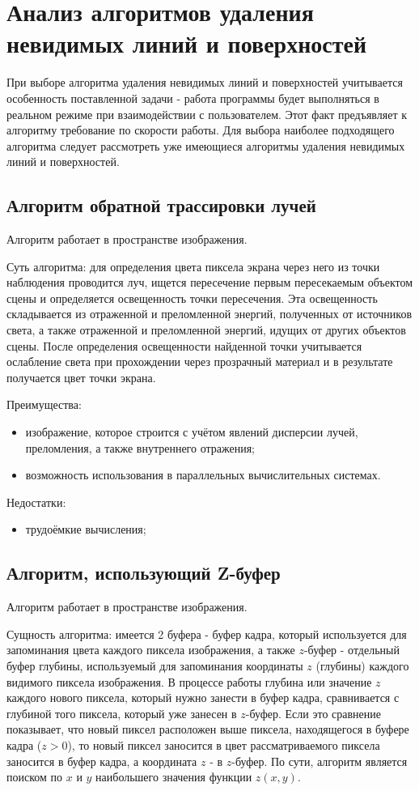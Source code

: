 \section{Анализ алгоритмов удаления невидимых линий и поверхностей}

При выборе алгоритма удаления невидимых линий и поверхностей учитывается особенность поставленной
задачи - работа программы будет выполняться в реальном режиме при взаимодействии с пользователем.
Этот факт предъявляет к алгоритму требование по скорости работы.
Для выбора наиболее подходящего алгоритма следует рассмотреть уже имеющиеся алгоритмы удаления невидимых линий и поверхностей.

\subsection{Алгоритм обратной трассировки лучей}
Алгоритм работает в пространстве изображения\cite{raytr}.

Суть алгоритма: для определения цвета пиксела экрана через него из точки наблюдения проводится луч,
ищется пересечение первым пересекаемым объектом сцены и определяется освещенность точки пересечения.
Эта освещенность складывается из отраженной и преломленной энергий, полученных от источников света,
а также отраженной и преломленной энергий, идущих от других объектов сцены.
После определения освещенности найденной точки учитывается ослабление света при прохождении через прозрачный материал
и в результате получается цвет точки экрана.

Преимущества:
\begin{itemize}
    \item изображение, которое строится с учётом явлений дисперсии лучей, преломления, а также внутреннего отражения;
    \item возможность использования в параллельных вычислительных системах.
\end{itemize}

Недостатки:
\begin{itemize}
    \item трудоёмкие вычисления\cite{tracer_proof};
\end{itemize}

\subsection{Алгоритм, использующий Z-буфер}
Алгоритм работает в пространстве изображения\cite{zbuf}.

Сущность алгоритма: имеется 2 буфера - буфер кадра, который используется для запоминания цвета каждого
пиксела изображения, а также $z$-буфер - отдельный буфер глубины,
используемый для запоминания координаты $z$ (глубины)
каждого видимого пиксела изображения.
В процессе работы глубина или значение $z$ каждого нового пиксела,
который нужно занести в буфер кадра, сравнивается с глубиной того пиксела,
который уже занесен в $z$-буфер.
Если это сравнение показывает, что новый пиксел расположен выше пиксела,
находящегося в буфере кадра ($z > 0$),
то новый пиксел заносится в цвет рассматриваемого пиксела заносится в буфер кадра, а координата $z$ - в $z$-буфер.
По сути, алгоритм является поиском по $x$ и $y$ наибольшего значения функции $z(x, y)$.

